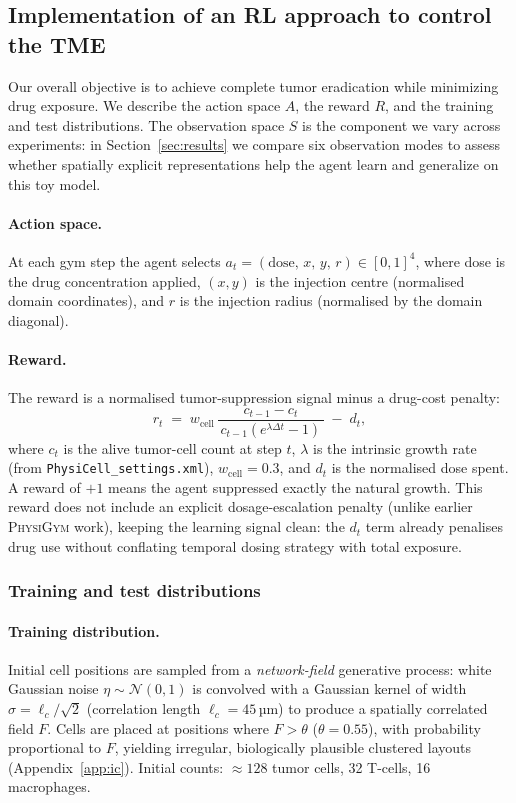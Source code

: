 \documentclass{article}
\newcommand{\physigym}{\textsc{PhysiGym}}
\begin{document}
\subsection{Implementation of an RL approach to control the TME}
\label{sec:rl}

Our overall objective is to achieve complete tumor eradication while minimizing
drug exposure. We describe the action space $A$, the reward $R$, and the
training and test distributions. The observation space $S$ is the component we
vary across experiments: in Section~\ref{sec:results} we compare six
observation modes to assess whether spatially explicit representations help
the agent learn and generalize on this toy model.

\paragraph{Action space.}
At each gym step the agent selects
$a_t = (\text{dose},\,x,\,y,\,r)\in[0,1]^4$,
where dose is the drug concentration applied, $(x,y)$ is the injection centre
(normalised domain coordinates), and $r$ is the injection radius (normalised
by the domain diagonal).

\paragraph{Reward.}
The reward is a normalised tumor-suppression signal minus a drug-cost penalty:
\begin{equation}
  r_t \;=\; w_{\text{cell}}\,
  \frac{c_{t-1} - c_t}{\,c_{t-1}(e^{\lambda\Delta t}-1)\,}
  \;-\; d_t,
  \label{eq:reward}
\end{equation}
where $c_t$ is the alive tumor-cell count at step $t$,
$\lambda$ is the intrinsic growth rate (from \texttt{PhysiCell\_settings.xml}),
$w_{\text{cell}}=0.3$, and $d_t$ is the normalised dose spent.
A reward of $+1$ means the agent suppressed exactly the natural growth.
This reward does not include an explicit dosage-escalation penalty
(unlike earlier \physigym{} work), keeping the learning signal clean: the
$d_t$ term already penalises drug use without conflating temporal dosing
strategy with total exposure.

\subsubsection*{Training and test distributions}
\label{sec:distributions}

\paragraph{Training distribution.}
Initial cell positions are sampled from a \emph{network-field} generative
process: white Gaussian noise $\eta\!\sim\!\mathcal{N}(0,1)$ is convolved
with a Gaussian kernel of width $\sigma=\ell_c/\sqrt{2}$ (correlation length
$\ell_c=45$\,µm) to produce a spatially correlated field $F$.
Cells are placed at positions where $F > \theta$ ($\theta=0.55$), with
probability proportional to $F$, yielding irregular, biologically plausible
clustered layouts (Appendix~\ref{app:ic}).
Initial counts: $\approx128$ tumor cells, 32 T-cells, 16 macrophages.
\end{document}
